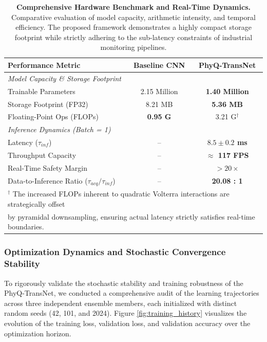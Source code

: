 \documentclass[5p,times,twocolumn]{elsarticle}
\begin{document}
\begin{table}[htbp]
\centering
\caption{\textbf{Comprehensive Hardware Benchmark and Real-Time Dynamics.} Comparative evaluation of model capacity, arithmetic intensity, and temporal efficiency. The proposed framework demonstrates a highly compact storage footprint while strictly adhering to the sub-latency constraints of industrial monitoring pipelines.}
\label{tab:complexity}
\renewcommand{\arraystretch}{1.3}
\setlength{\tabcolsep}{12pt}
\begin{tabular}{lcc}
\toprule
\textbf{Performance Metric} & \textbf{Baseline CNN} & \textbf{PhyQ-TransNet} \\ 
\midrule
\multicolumn{3}{l}{\textit{Model Capacity \& Storage Footprint}} \\
Trainable Parameters & 2.15 Million & \textbf{1.40 Million} \\
Storage Footprint (FP32) & 8.21 MB & \textbf{5.36 MB} \\
Floating-Point Ops (FLOPs) & \textbf{0.95 G} & 3.21 G$^{\dagger}$ \\ 
\midrule
\multicolumn{3}{l}{\textit{Inference Dynamics (Batch = 1)}} \\
Latency ($\tau_{inf}$) & -- & \textbf{$8.5 \pm 0.2$ ms} \\
Throughput Capacity & -- & \textbf{$\approx$ 117 FPS} \\
Real-Time Safety Margin & -- & \textbf{$> 20\times$} \\
Data-to-Inference Ratio ($\tau_{acq}/\tau_{inf}$) & -- & \textbf{20.08 : 1} \\ 
\bottomrule
\multicolumn{3}{l}{\footnotesize $^{\dagger}$ The increased FLOPs inherent to quadratic Volterra interactions are strategically offset} \\
\multicolumn{3}{l}{\footnotesize by pyramidal downsampling, ensuring actual latency strictly satisfies real-time boundaries.}
\end{tabular}
\end{table}

\subsubsection{Optimization Dynamics and Stochastic Convergence Stability}
To rigorously validate the stochastic stability and training robustness of the PhyQ-TransNet, we conducted a comprehensive audit of the learning trajectories across three independent ensemble members, each initialized with distinct random seeds (42, 101, and 2024). Figure \ref{fig:training_history} visualizes the evolution of the training loss, validation loss, and validation accuracy over the optimization horizon.
\end{document}
